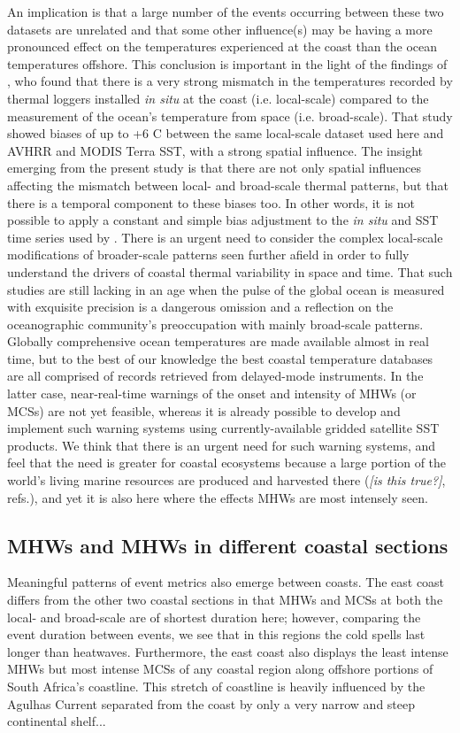 \documentclass[a4paper,10pt,review]{elsarticle}
\begin{document}
An implication is that a large number of the events occurring between these two datasets are unrelated and that some other influence(s) may be having a more pronounced effect on the temperatures experienced at the coast than the ocean temperatures offshore. This conclusion is important in the light of the findings of \citet{Smit2013}, who found that there is a very strong mismatch in the temperatures recorded by thermal loggers installed \emph{in situ} at the coast (i.e. local-scale) compared to the measurement of the ocean's temperature from space (i.e. broad-scale). That study showed biases of up to +6 \degree C between the same local-scale dataset used here and AVHRR and MODIS Terra SST, with a strong spatial influence. The insight emerging from the present study is that there are not only spatial influences affecting the mismatch between local- and broad-scale thermal patterns, but that there is a temporal component to these biases too. In other words, it is not possible to apply a constant and simple bias adjustment to the \emph{in situ} and SST time series used by \citet{Smit2013}. There is an urgent need to consider the complex local-scale modifications of broader-scale patterns seen further afield in order to fully understand the drivers of coastal thermal variability in space and time. That such studies are still lacking in an age when the pulse of the global ocean is measured with exquisite precision is a dangerous omission and a reflection on the oceanographic community's preoccupation with mainly broad-scale patterns. Globally comprehensive ocean temperatures are made available almost in real time, but to the best of our knowledge the best coastal temperature databases are all comprised of records retrieved from delayed-mode instruments. In the latter case, near-real-time warnings of the onset and intensity of MHWs (or MCSs) are not yet feasible, whereas it is already possible to develop and implement such warning systems using currently-available gridded satellite SST products. We think that there is an urgent need for such warning systems, and feel that the need is greater for coastal ecosystems because a large portion of the world's living marine resources are produced and harvested there (\emph{[is this true?]}, refs.), and yet it is also here where the effects MHWs are most intensely seen.

\subsection{MHWs and MHWs in different coastal sections}
Meaningful patterns of event metrics also emerge between coasts. The east coast differs from the other two coastal sections in that MHWs and MCSs at both the local- and broad-scale are of shortest duration here; however, comparing the event duration between events, we see that in this regions the cold spells last longer than heatwaves. Furthermore, the east coast also displays the least intense MHWs but most intense MCSs of any coastal region along offshore portions of South Africa's coastline. This stretch of coastline is heavily influenced by the Agulhas Current separated from the coast by only a very narrow and steep continental shelf...
\end{document}

